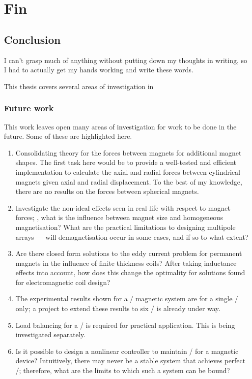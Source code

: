 
\part*{Fin}

\chapter{Conclusion}

\epigraph{
  I can't grasp much of anything without putting down my thoughts in writing, so I had to actually get my hands working and write these words.
}{\textcite{murakami2008}}

This thesis covers several areas of investigation in

\section{Future work}

This work leaves open many areas of investigation for work to be done in the future.
Some of these are highlighted here.

\begin{enumerate}
\item
Consolidating theory for the forces between magnets for additional magnet shapes.
The first task here would be to provide a well-tested and efficient implementation to calculate the axial and radial forces between cylindrical magnets given axial and radial displacement.
To the best of my knowledge, there are no results on the forces between spherical magnets.

\item
Investigate the non-ideal effects seen in real life with respect to magnet forces; \eg, what is the influence between magnet size and homogeneous magnetisation?
What are the practical limitations to designing multipole arrays — will demagnetisation occur in some cases, and if so to what extent?

\item
Are there closed form solutions to the eddy current problem for permanent magnets in the influence of finite thickness coils?
After taking inductance effects into account, how does this change the optimality for solutions found for electromagnetic coil design?

\item
The experimental results shown for a \qzs/ magnetic system are for a single \dof/ only; a project to extend these results to six \dof/ is already under way.

\item
Load balancing for a \qzs/ is required for practical application.
This is being investigated separately.

\item
Is it possible to design a nonlinear controller to maintain \qzs/ for a magnetic device?
Intuitively, there may never be a stable system that achieves perfect \qzs/; therefore, what are the limits to which such a system can be bound?

\end{enumerate}

